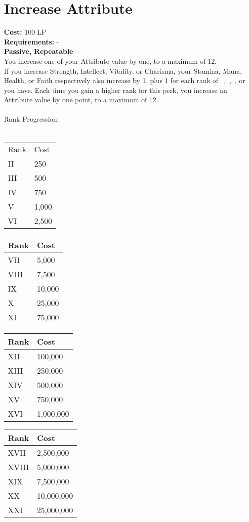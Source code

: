 \section{Increase Attribute}\label{sec:increaseattribute}
\textbf{Cost:} 100 LP\\
\textbf{Requirements:} -\\
\textbf{Passive, Repeatable}\\
You increase one of your Attribute value by one, to a maximum of 12.\\
If you increase Strength, Intellect, Vitality, or Charisma, your Stamina, Mana, Health, or Faith respectively also increase by 1, plus 1 for each rank of ~,~,~, or ~ you have.
Each time you gain a higher rank for this perk, you increase an Attribute value by one point, to a maximum of 12.\\
\\
Rank Progression:\\
\\
\begin{minipage}{0.22\textwidth}
	\begin{tabular}{l | l}
		Rank & Cost\\
		II & 250\\
		III & 500\\
		IV & 750\\
		V & 1,000\\
		VI & 2,500\\
	\end{tabular}
\end{minipage}
\begin{minipage}{0.22\textwidth}
	\begin{tabular}{l | l}
		Rank & Cost\\ \hline
		VII & 5,000\\
		VIII & 7,500\\
		IX & 10,000\\
		X & 25,000\\
		XI & 75,000\\
	\end{tabular}
\end{minipage}
\begin{minipage}{0.22\textwidth}
	\begin{tabular}{l | l}
		Rank & Cost\\ \hline
		XII & 100,000\\
		XIII & 250,000\\
		XIV & 500,000\\
		XV & 750,000\\
		XVI & 1,000,000\\
	\end{tabular}
\end{minipage}
\begin{minipage}{0.22\textwidth}
	\begin{tabular}{l | l}
		Rank & Cost\\ \hline
		XVII & 2,500,000\\
		XVIII & 5,000,000\\
		XIX & 7,500,000\\
		XX & 10,000,000\\
		XXI & 25,000,000\\
	\end{tabular}
\end{minipage}